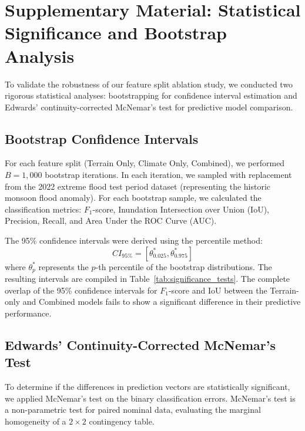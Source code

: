 \section*{Supplementary Material: Statistical Significance and Bootstrap Analysis}

To validate the robustness of our feature split ablation study, we conducted two rigorous statistical analyses: bootstrapping for confidence interval estimation and Edwards' continuity-corrected McNemar's test for predictive model comparison.

\subsection*{Bootstrap Confidence Intervals}
For each feature split (Terrain Only, Climate Only, Combined), we performed $B = 1,000$ bootstrap iterations. In each iteration, we sampled with replacement from the 2022 extreme flood test period dataset (representing the historic monsoon flood anomaly). For each bootstrap sample, we calculated the classification metrics: $F_1$-score, Inundation Intersection over Union (IoU), Precision, Recall, and Area Under the ROC Curve (AUC).

The 95\% confidence intervals were derived using the percentile method:
\begin{equation}
    CI_{95\%} = \left[ \theta^*_{0.025}, \theta^*_{0.975} \right]
\end{equation}
where $\theta^*_p$ represents the $p$-th percentile of the bootstrap distributions. The resulting intervals are compiled in Table~\ref{tab:significance_tests}. The complete overlap of the 95\% confidence intervals for $F_1$-score and IoU between the Terrain-only and Combined models fails to show a significant difference in their predictive performance.

\subsection*{Edwards' Continuity-Corrected McNemar's Test}
To determine if the differences in prediction vectors are statistically significant, we applied McNemar's test on the binary classification errors. McNemar's test is a non-parametric test for paired nominal data, evaluating the marginal homogeneity of a $2 \times 2$ contingency table.

